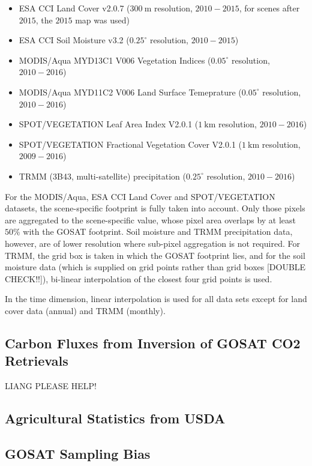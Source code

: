 \documentclass[preprint, a4paper, 10pt, times]{elsarticle}
\begin{document}
\begin{itemize}
\item ESA CCI Land Cover v2.0.7 ($300\:\mathrm{m}$ resolution, $2010-2015$, for scenes after $2015$, the $2015$ map was used) \citep{Bontemps2013}
\item ESA CCI Soil Moisture v3.2 ($0.25^\circ$ resolution, $2010-2015$) \citep{Dorigo2017}
\item MODIS/Aqua MYD13C1 V006 Vegetation Indices ($0.05^\circ$ resolution, $2010-2016$) \citep{MYD13C1}
\item MODIS/Aqua MYD11C2 V006 Land Surface Temeprature ($0.05^\circ$ resolution, $2010-2016$) \citep{MYD11C2}
\item SPOT/VEGETATION Leaf Area Index V2.0.1 ($1\:\mathrm{km}$ resolution, $2010-2016$)
\item SPOT/VEGETATION Fractional Vegetation Cover V2.0.1 ($1\:\mathrm{km}$ resolution, $2009-2016$)
\item TRMM (3B43, multi-satellite) precipitation ($0.25^\circ$ resolution, $2010-2016$)
\end{itemize}

For the MODIS/Aqua, ESA CCI Land Cover and SPOT/VEGETATION datasets, the scene-specific footprint is fully taken into account. Only those pixels are aggregated to the scene-specific value, whose pixel area overlaps by at least $50\%$ with the GOSAT footprint. Soil moisture and TRMM precipitation data, however, are of lower resolution where sub-pixel aggregation is not required. For TRMM, the grid box is taken in which the GOSAT footprint lies, and for the soil moisture data (which is supplied on grid points rather than grid boxes [DOUBLE CHECK!!]), bi-linear interpolation of the closest four grid points is used.

In the time dimension, linear interpolation is used for all data sets except for land cover data (annual) and TRMM (monthly).


\subsection{Carbon Fluxes from Inversion of GOSAT CO2 Retrievals}
\label{sec:fluxes}
LIANG PLEASE HELP!

\subsection{Agricultural Statistics from USDA}
\label{sec:usda}

\subsection{GOSAT Sampling Bias}
\label{sec:sampling_bias}
\end{document}
